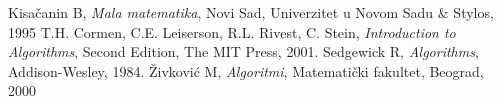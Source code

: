 \documentclass[a4paper,12pt]{article}
\begin{document}
\begin{thebibliography}{10}
\bibitem{} Kisa\v canin B, \textit{Mala matematika},
Novi Sad, Univerzitet u Novom Sadu \& Stylos, 1995
\bibitem{} T.H. Cormen, C.E. Leiserson, R.L. Rivest, C. Stein, \textit{Introduction to Algorithms}, Second Edition,
The MIT Press, 2001.
\bibitem{} Sedgewick R, \textit{Algorithms}, Addison-Wesley, 1984.
\bibitem{} \v Zivkovi\' c M, \textit{Algoritmi}, Matemati\v cki fakultet, Beograd, 2000

\end{thebibliography}
\end{document}
